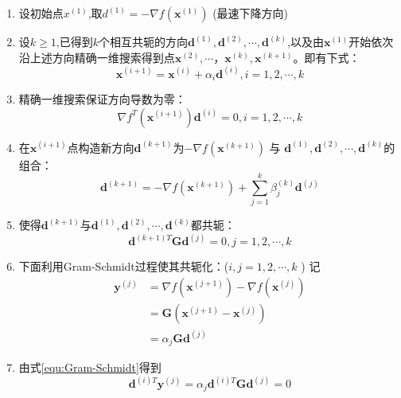 \documentclass{book}
\begin{document}
\begin{enumerate}
    \item 设初始点$x^{(1)}$,取$d^{(1)}= -\nabla f(\boldsymbol{x}^{(1)})$ (最速下降方向)
    \item 设$k\ge1$,已得到$k$个相互共轭的方向$\boldsymbol{d}^{(1)},\boldsymbol{d}^{(2)}, \cdots,\boldsymbol{d}^{(k)}$,以及由$\boldsymbol{x}^{(1)}$开始依次沿上述方向精确一维搜索得到点$\boldsymbol{x}^{(2)}, \cdots，\boldsymbol{x}^{(k)},\boldsymbol{x}^{(k+1)}$。即有下式：
          $$\boldsymbol{x}^{(i+1)}=\boldsymbol{x}^{(i)}+\alpha_i\boldsymbol{d}^{(i)} , i=1,2, \cdots, k$$
    \item 精确一维搜索保证方向导数为零：
          \begin{equation}
              \nabla f^T(\boldsymbol{x}^{(i+1)})\boldsymbol{d}^{(i)}=0, i=1,2, \cdots,k
              \label{equ:conjugate-step-3}
          \end{equation}
    \item 在$\boldsymbol{x}^{(i+1)}$点构造新方向$\boldsymbol{d}^{(k+1)}$为$-\nabla f(\boldsymbol{x}^{(k+1)})$ 与 $\boldsymbol{d}^{(1)},\boldsymbol{d}^{(2)}, \cdots,\boldsymbol{d}^{(k)}$的组合：
          $$ \boldsymbol{d}^{(k+1)}=-\nabla f(\boldsymbol{x}^{(k+1)})+\sum_{j=1}^k\beta_j^{(k)}\boldsymbol{d}^{(j)}$$
    \item 使得$\boldsymbol{d}^{(k+1)}$与$\boldsymbol{d}^{(1)},\boldsymbol{d}^{(2)}, \cdots,\boldsymbol{d}^{(k)}$都共轭：
          \begin{equation}
              \boldsymbol{d}^{(k+1)T}\boldsymbol{Gd}^{(j)}=0, j=1,2, \cdots,k
              \label{equ:construction-conjugate}
          \end{equation}
    \item 下面利用Gram-Schmidt过程使其共轭化：($i,j=1,2,\cdots,k$ )
          记 \begin{align}
              \boldsymbol{y}^{(j)} & =\nabla f(\boldsymbol{x}^{(j+1)})-\nabla f(\boldsymbol{x}^{(j)}) \\
                                   & =\boldsymbol{G}(\boldsymbol{x}^{(j+1)}-\boldsymbol{x}^{(j)})     \\
                                   & =\alpha_j\boldsymbol{G}\boldsymbol{d}^{(j)}
              \label{equ:Gram-Schmidt}
          \end{align}
    \item 由式\ref{equ:Gram-Schmidt}得到
          \begin{equation}
              \boldsymbol{d}^{(i)T}\boldsymbol{y}^{(j)}=\alpha_j\boldsymbol{d}^{(i)T}\boldsymbol{Gd}^{(j)}=0

\end{equation}
\end{enumerate}
\end{document}

